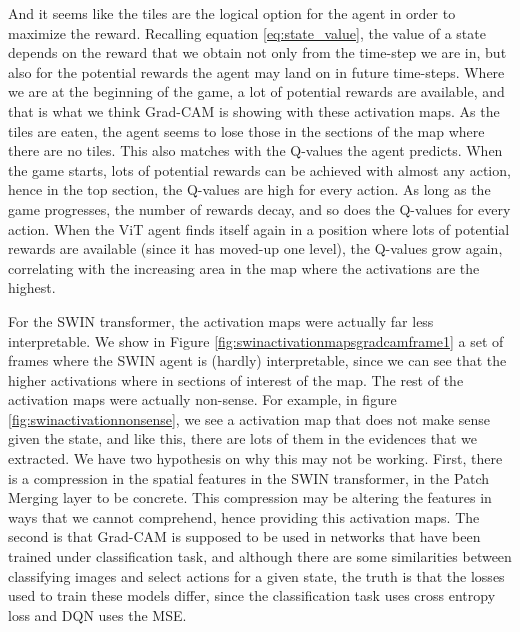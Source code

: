 And it seems like the tiles are the logical option for the agent in order to maximize the reward. Recalling equation \ref{eq:state_value}, the value of a state depends on the reward that we obtain not only from the time-step we are in, but also for the potential rewards the agent may land on in future time-steps. Where we are at the beginning of the game, a lot of potential rewards are available, and that is what we think Grad-CAM is showing with these activation maps. As the tiles are eaten, the agent seems to lose those in the sections of the map where there are no tiles. This also matches with the Q-values the agent predicts. When the game starts, lots of potential rewards can be achieved with almost any action, hence in the top section, the Q-values are high for every action. As long as the game progresses, the number of rewards decay, and so does the Q-values for every action. When the ViT agent finds itself again in a position where lots of potential rewards are available (since it has moved-up one level), the Q-values grow again, correlating with the increasing area in the map where the activations are the highest.

For the SWIN transformer, the activation maps were actually far less interpretable. We show in Figure \ref{fig:swinactivationmapsgradcamframe1} a set of frames where the SWIN agent is (hardly) interpretable, since we can see that the higher activations where in sections of interest of the map. The rest of the activation maps were actually non-sense. For example, in figure \ref{fig:swinactivationnonsense}, we see a activation map that does not make sense given the state, and like this, there are lots of them in the evidences that we extracted. We have two hypothesis on why this may not be working. First, there is a compression in the spatial features in the SWIN transformer, in the Patch Merging layer to be concrete. This compression may be altering the features in ways that we cannot comprehend, hence providing this activation maps. The second is that Grad-CAM is supposed to be used in networks that have been trained under classification task, and although there are some similarities between classifying images and select actions for a given state, the truth is that the losses used to train these models differ, since the classification task uses cross entropy loss and DQN uses the MSE.

